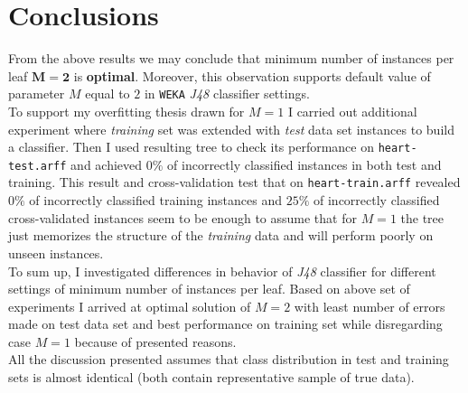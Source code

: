 \documentclass[12pt,a4paper,twocolumn]{article}
\begin{document}
\section*{Conclusions}
From the above results we may conclude that minimum number of instances per leaf $\mathbf{M=2}$ is \textbf{optimal}. Moreover, this observation supports default value of parameter $M$ equal to $2$ in \texttt{WEKA} \textit{J48} classifier settings.\\
To support my overfitting thesis drawn for $M=1$ I carried out additional experiment where \textit{training} set was extended with \textit{test} data set instances to build a classifier. Then I used resulting tree to check its performance on \texttt{heart-test.arff} and achieved $0\%$ of incorrectly classified instances in both test and training. This result and cross-validation test that on \texttt{heart-train.arff} revealed $0\%$ of incorrectly classified training instances and $25\%$ of incorrectly classified cross-validated instances seem to be enough to assume that for $M=1$ the tree just memorizes the structure of the \textit{training} data and will perform poorly on unseen instances.\\
To sum up, I investigated differences in behavior of \textit{J48} classifier for different settings of minimum number of instances per leaf. Based on above set of experiments I arrived at optimal solution of $M=2$ with least number of errors made on test data set and best performance on training set while disregarding case $M=1$ because of presented reasons.\\
All the discussion presented assumes that class distribution in test and training sets is almost identical (both contain representative sample of true data).
\end{document}
